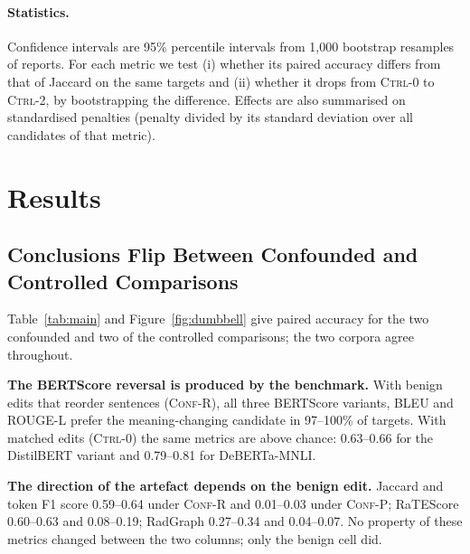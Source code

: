 \documentclass[11pt]{article}
\newcommand{\ctrlz}{\textsc{Ctrl-0}\xspace}
\newcommand{\ctrlt}{\textsc{Ctrl-2}\xspace}
\newcommand{\confr}{\textsc{Conf-R}\xspace}
\newcommand{\confp}{\textsc{Conf-P}\xspace}
\newcommand{\tbd}[1]{\textcolor{red}{[TBD: #1]}}
\begin{document}
\paragraph{Statistics.}
Confidence intervals are 95\% percentile intervals from 1,000 bootstrap resamples of reports. For each metric we test (i) whether its paired accuracy differs from that of Jaccard on the same targets and (ii) whether it drops from \ctrlz to \ctrlt, by bootstrapping the difference. Effects are also summarised on standardised penalties (penalty divided by its standard deviation over all candidates of that metric).

\section{Results}

\begin{table}[t]
\centering
\small
\setlength{\tabcolsep}{5pt}
\begin{adjustbox}{max width=\textwidth}

\end{adjustbox}
\caption{Paired accuracy (chance 0.5). \textsc{R}: \confr (C0 vs.\ P1). \textsc{P}: \confp (C0 vs.\ P2). \textsc{0}: \ctrlz (C0 vs.\ P0). \textsc{2}: \ctrlt (C2 vs.\ P2). $^{\downarrow}$ significantly below and $^{\circ}$ not distinguishable from the Jaccard baseline in \ctrlz; $^{\ast}$ significant drop from \ctrlz to \ctrlt (bootstrap over reports, 95\%). Proprietary judges: \tbd{rows}.}
\label{tab:main}
\end{table}

\subsection{Conclusions Flip Between Confounded and Controlled Comparisons}

Table~\ref{tab:main} and Figure~\ref{fig:dumbbell} give paired accuracy for the two confounded and two of the controlled comparisons; the two corpora agree throughout.

\textbf{The BERTScore reversal is produced by the benchmark.} With benign edits that reorder sentences (\confr), all three BERTScore variants, BLEU and ROUGE-L prefer the meaning-changing candidate in 97--100\% of targets. With matched edits (\ctrlz) the same metrics are above chance: 0.63--0.66 for the DistilBERT variant and 0.79--0.81 for DeBERTa-MNLI.

\textbf{The direction of the artefact depends on the benign edit.} Jaccard and token F1 score 0.59--0.64 under \confr and 0.01--0.03 under \confp; RaTEScore 0.60--0.63 and 0.08--0.19; RadGraph 0.27--0.34 and 0.04--0.07. No property of these metrics changed between the two columns; only the benign cell did.
\end{document}
